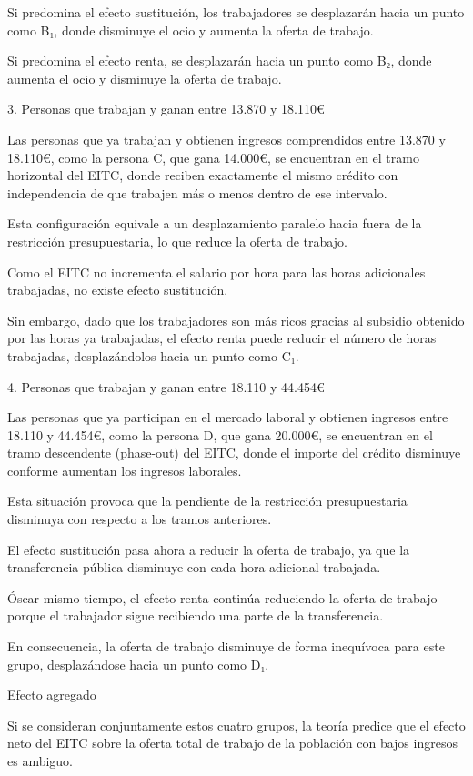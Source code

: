 \documentclass[10pt,a4paper]{article}
\begin{document}
Si predomina el efecto sustitución, los trabajadores se desplazarán hacia un punto como B₁, donde disminuye el ocio y aumenta la oferta de trabajo.

Si predomina el efecto renta, se desplazarán hacia un punto como B₂, donde aumenta el ocio y disminuye la oferta de trabajo.

3. Personas que trabajan y ganan entre 13.870 y 18.110€

Las personas que ya trabajan y obtienen ingresos comprendidos entre 13.870 y 18.110€, como la persona C, que gana 14.000€, se encuentran en el tramo horizontal del EITC, donde reciben exactamente el mismo crédito con independencia de que trabajen más o menos dentro de ese intervalo.

Esta configuración equivale a un desplazamiento paralelo hacia fuera de la restricción presupuestaria, lo que reduce la oferta de trabajo.

Como el EITC no incrementa el salario por hora para las horas adicionales trabajadas, no existe efecto sustitución.

Sin embargo, dado que los trabajadores son más ricos gracias al subsidio obtenido por las horas ya trabajadas, el efecto renta puede reducir el número de horas trabajadas, desplazándolos hacia un punto como C₁.

4. Personas que trabajan y ganan entre 18.110 y 44.454€

Las personas que ya participan en el mercado laboral y obtienen ingresos entre 18.110 y 44.454€, como la persona D, que gana 20.000€, se encuentran en el tramo descendente (phase-out) del EITC, donde el importe del crédito disminuye conforme aumentan los ingresos laborales.

Esta situación provoca que la pendiente de la restricción presupuestaria disminuya con respecto a los tramos anteriores.

El efecto sustitución pasa ahora a reducir la oferta de trabajo, ya que la transferencia pública disminuye con cada hora adicional trabajada.

Óscar mismo tiempo, el efecto renta continúa reduciendo la oferta de trabajo porque el trabajador sigue recibiendo una parte de la transferencia.

En consecuencia, la oferta de trabajo disminuye de forma inequívoca para este grupo, desplazándose hacia un punto como D₁.

Efecto agregado

Si se consideran conjuntamente estos cuatro grupos, la teoría predice que el efecto neto del EITC sobre la oferta total de trabajo de la población con bajos ingresos es ambiguo.
\end{document}
